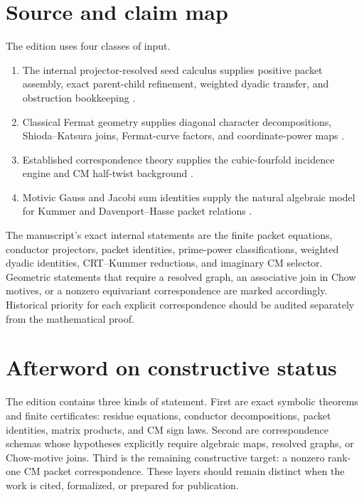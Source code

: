 \documentclass[11pt,oneside]{book}
\theoremstyle{definition}
\theoremstyle{remark}
\begin{document}
\chapter{Source and claim map}
The edition uses four classes of input.
\begin{enumerate}
\item The internal projector-resolved seed calculus supplies positive packet assembly, exact parent-child refinement, weighted dyadic transfer, and obstruction bookkeeping \cite{SeedI,SeedII,SeedIII}.
\item Classical Fermat geometry supplies diagonal character decompositions, Shioda--Katsura joins, Fermat-curve factors, and coordinate-power maps \cite{ShiodaKatsura}.
\item Established correspondence theory supplies the cubic-fourfold incidence engine and CM half-twist background \cite{BeauvilleDonagi,VanGeemenHalfTwist,VanGeemenIzadi}.
\item Motivic Gauss and Jacobi sum identities supply the natural algebraic model for Kummer and Davenport--Hasse packet relations \cite{OtsuboYamazaki}.
\end{enumerate}

The manuscript's exact internal statements are the finite packet equations, conductor projectors, packet identities, prime-power classifications, weighted dyadic identities, CRT--Kummer reductions, and imaginary CM selector. Geometric statements that require a resolved graph, an associative join in Chow motives, or a nonzero equivariant correspondence are marked accordingly. Historical priority for each explicit correspondence should be audited separately from the mathematical proof.



\backmatter
\chapter*{Afterword on constructive status}
The edition contains three kinds of statement. First are exact symbolic theorems and finite certificates: residue equations, conductor decompositions, packet identities, matrix products, and CM sign laws. Second are correspondence schemas whose hypotheses explicitly require algebraic maps, resolved graphs, or Chow-motive joins. Third is the remaining constructive target: a nonzero rank-one CM packet correspondence. These layers should remain distinct when the work is cited, formalized, or prepared for publication.
\end{document}
